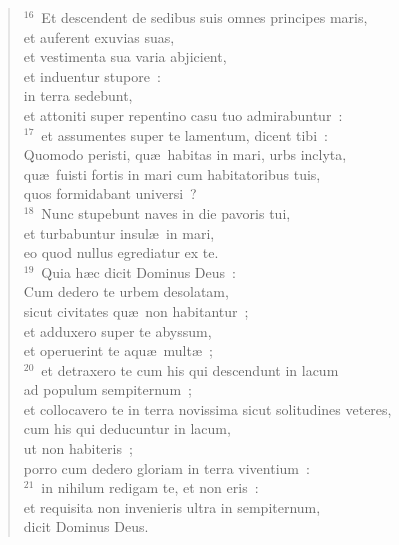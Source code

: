 \begin{verse}
${}^{16}$~Et descendent de sedibus suis omnes principes maris,\\ et auferent exuvias suas,\\ et vestimenta sua varia abjicient,\\ et induentur stupore~:\\ in terra sedebunt,\\ et attoniti super repentino casu tuo admirabuntur~:\\
${}^{17}$~et assumentes super te lamentum, dicent tibi~:\\ Quomodo peristi, qu\ae\ habitas in mari, urbs inclyta,\\ qu\ae\ fuisti fortis in mari cum habitatoribus tuis,\\ quos formidabant universi~?\\
${}^{18}$~Nunc stupebunt naves in die pavoris tui,\\ et turbabuntur insul\ae\ in mari,\\ eo quod nullus egrediatur ex te.\\
${}^{19}$~Quia h\ae c dicit Dominus Deus~:\\ Cum dedero te urbem desolatam,\\ sicut civitates qu\ae\ non habitantur~;\\ et adduxero super te abyssum,\\ et operuerint te aqu\ae\ mult\ae~;\\
${}^{20}$~et detraxero te cum his qui descendunt in lacum\\ ad populum sempiternum~;\\ et collocavero te in terra novissima sicut solitudines veteres,\\ cum his qui deducuntur in lacum,\\ ut non habiteris~;\\ porro cum dedero gloriam in terra viventium~:\\
${}^{21}$~in nihilum redigam te, et non eris~:\\ et requisita non invenieris ultra in sempiternum,\\ dicit Dominus Deus.\end{verse}



